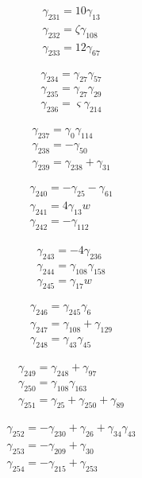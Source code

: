 \[\begin{aligned}\gamma_{231}=10 \gamma_{13}\\ \gamma_{232}=\zeta  \gamma_{108}\\ \gamma_{233}=12 \gamma_{67}\end{aligned}\]

\[\begin{aligned}\gamma_{234}=\gamma_{27} \gamma_{57}\\ \gamma_{235}=\gamma_{27} \gamma_{29}\\ \gamma_{236}=\varsigma  \gamma_{214}\end{aligned}\]

\[\begin{aligned}\gamma_{237}=\gamma_{0} \gamma_{114}\\ \gamma_{238}=- \gamma_{50}\\ \gamma_{239}=\gamma_{238} + \gamma_{31}\end{aligned}\]

\[\begin{aligned}\gamma_{240}=- \gamma_{25} - \gamma_{61}\\ \gamma_{241}=4 \gamma_{13} w\\ \gamma_{242}=- \gamma_{112}\end{aligned}\]

\[\begin{aligned}\gamma_{243}=- 4 \gamma_{236}\\ \gamma_{244}=\gamma_{108} \gamma_{158}\\ \gamma_{245}=\gamma_{17} w\end{aligned}\]

\[\begin{aligned}\gamma_{246}=\gamma_{245} \gamma_{6}\\ \gamma_{247}=\gamma_{108} + \gamma_{129}\\ \gamma_{248}=\gamma_{43} \gamma_{45}\end{aligned}\]

\[\begin{aligned}\gamma_{249}=\gamma_{248} + \gamma_{97}\\ \gamma_{250}=\gamma_{108} \gamma_{163}\\ \gamma_{251}=\gamma_{25} + \gamma_{250} + \gamma_{89}\end{aligned}\]

\[\begin{aligned}\gamma_{252}=- \gamma_{230} + \gamma_{26} + \gamma_{34} \gamma_{43}\\ \gamma_{253}=- \gamma_{209} + \gamma_{30}\\ \gamma_{254}=- \gamma_{215} + \gamma_{253}\end{aligned}\]


